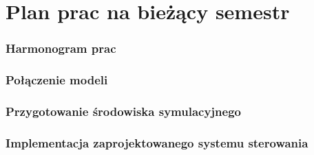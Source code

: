 \section{Plan prac na bieżący semestr}

\begin{frame}
	\frametitle{Harmonogram prac}
\end{frame}


\begin{frame}
	\frametitle{Połączenie modeli}
\end{frame}


\begin{frame}
	\frametitle{Przygotowanie środowiska symulacyjnego}
\end{frame}


\begin{frame}
	\frametitle{Implementacja zaprojektowanego systemu sterowania}
\end{frame}

